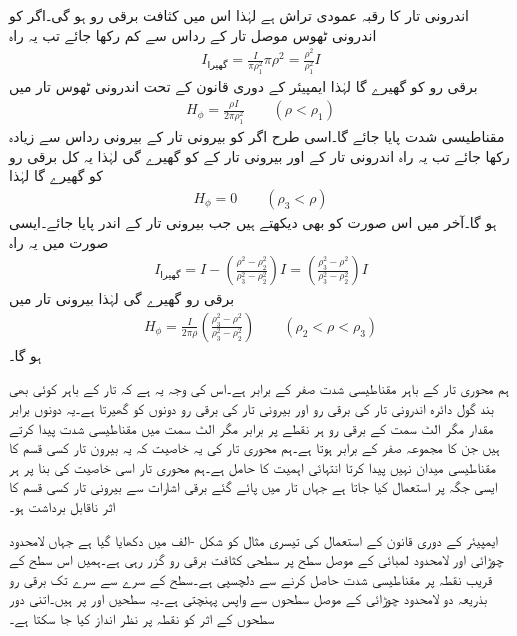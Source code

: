 اندرونی تار کا رقبہ عمودی تراش  ہے لہٰذا اس میں کثافت برقی رو  ہو گی۔اگر  کو اندرونی ٹھوس موصل تار کے رداس  سے کم رکھا جائے تب یہ راہ
\begin{align*}
I_{\text{گھیرا}}=\frac{I}{\pi \rho_1^2}\pi \rho^2=\frac{\rho^2}{\rho_1^2} I
\end{align*}
برقی رو کو گھیرے گا لہٰذا ایمپیئر کے دوری قانون کے تحت اندرونی ٹھوس تار میں
\begin{align*}
H_{\phi}=\frac{\rho I}{2\pi \rho_1^2} \quad \quad (\rho < \rho_1)
\end{align*}
مقناطیسی شدت پایا جائے گا۔اسی طرح اگر  کو بیرونی تار کے بیرونی رداس  سے زیادہ رکھا جائے تب یہ راہ اندرونی تار کے  اور بیرونی تار کے  کو گھیرے گی لہٰذا یہ  کل  برقی رو کو گھیرے گا لہٰذا 
\begin{align*}
H_{\phi} =0 \quad \quad (\rho_3 < \rho)
\end{align*}
ہو گا۔آخر میں اس صورت کو بھی دیکھتے ہیں جب  بیرونی تار کے اندر پایا جائے۔ایسی صورت میں یہ راہ
\begin{align*}
I_{\text{گھیرا}}=I-\left(\frac{\rho^2-\rho_2^2}{\rho_3^2-\rho_2^2}\right) I=\left(\frac{\rho_3^2-\rho^2}{\rho_3^2-\rho_2^2}\right)I
\end{align*}
برقی رو گھیرے گی لہٰذا بیرونی تار میں
\begin{align*}
H_{\phi}=\frac{I}{2\pi \rho} \left(\frac{\rho_3^2-\rho^2}{\rho_3^2-\rho_2^2} \right) \quad \quad (\rho_2<\rho<\rho_3)
\end{align*}
ہو گا۔ 

ہم محوری تار کے باہر مقناطیسی شدت صفر کے برابر ہے۔اس کی وجہ یہ ہے کہ تار کے باہر کوئی بھی بند گول دائرہ اندرونی تار کی برقی رو  اور بیرونی تار کی برقی رو  دونوں کو گھیرتا ہے۔یہ دونوں برابر مقدار مگر الٹ سمت کے برقی رو ہر نقطے پر برابر مگر الٹ سمت میں مقناطیسی شدت پیدا کرتے ہیں جن کا مجموعہ صفر کے برابر ہوتا ہے۔ہم محوری تار کی یہ خاصیت کہ یہ بیرون تار کسی قسم کا مقناطیسی میدان نہیں پیدا کرتا انتہائی اہمیت کا حامل ہے۔ہم محوری تار اسی خاصیت کی بنا پر ہر ایسی جگہ پر استعمال کیا جاتا ہے جہاں تار میں پائے گئے برقی اشارات سے بیرونی تار کسی قسم کا اثر ناقابل برداشت ہو۔

ایمپیئر کے دوری قانون کے استعمال کی تیسری مثال کو شکل -الف میں دکھایا گیا ہے جہاں  لامحدود چوڑائی اور لامحدود لمبائی کے موصل سطح پر  سطحی کثافت برقی رو گزر رہی ہے۔ہمیں اس سطح کے قریب نقطہ  پر مقناطیسی شدت حاصل کرنے سے دلچسپی ہے۔سطح کے  سرے سے  سرے تک برقی رو بذریعہ دو لامحدود چوڑائی کے موصل سطحوں سے واپس پہنچتی ہے۔یہ سطحیں  اور  پر ہیں۔اتنی دور سطحوں کے اثر کو نقطہ  پر نظر انداز کیا جا سکتا ہے۔


